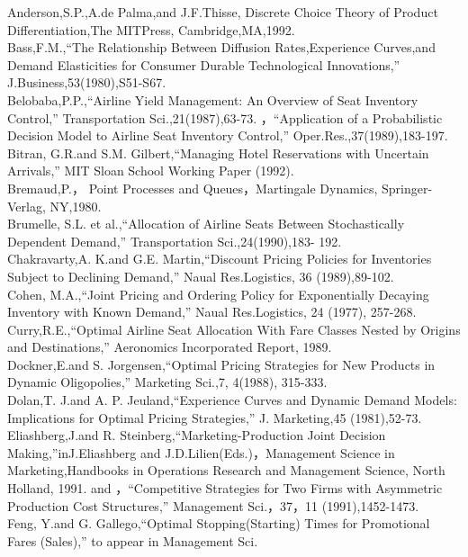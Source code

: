 Anderson,S.P.,A.de Palma,and J.F.Thisse, Discrete Choice Theory of
Product Differentiation,The MITPress, Cambridge,MA,1992.\\
Bass,F.M.,``The Relationship Between Diffusion Rates,Experience
Curves,and Demand Elasticities for Consumer Durable Technological
Innovations,'' J.Business,53(1980),S51-S67.\\
Belobaba,P.P.,``Airline Yield Management: An Overview of Seat Inventory
Control,'' Transportation Sci.,21(1987),63-73. ，``Application of a
Probabilistic Decision Model to Airline Seat Inventory Control,''
Oper.Res.,37(1989),183-197.\\
Bitran, G.R.and S.M. Gilbert,``Managing Hotel Reservations with
Uncertain Arrivals,'' MIT Sloan School Working Paper (1992).\\
Bremaud,P.， Point Processes and Queues，Martingale Dynamics,
Springer-Verlag, NY,1980.\\
Brumelle, S.L. et al.,``Allocation of Airline Seats Between
Stochastically Dependent Demand,'' Transportation Sci.,24(1990),183-
192.\\
Chakravarty,A. K.and G.E. Martin,``Discount Pricing Policies for
Inventories Subject to Declining Demand,'' Naual Res.Logistics, 36
(1989),89-102.\\
Cohen, M.A.,``Joint Pricing and Ordering Policy for Exponentially
Decaying Inventory with Known Demand,'' Naual Res.Logistics, 24 (1977),
257-268.\\
Curry,R.E.,``Optimal Airline Seat Allocation With Fare Classes Nested by
Origins and Destinations,'' Aeronomics Incorporated Report, 1989.\\
Dockner,E.and S. Jorgensen,``Optimal Pricing Strategies for New Products
in Dynamic Oligopolies,'' Marketing Sci.,7, 4(1988), 315-333.\\
Dolan,T. J.and A. P. Jeuland,``Experience Curves and Dynamic Demand
Models: Implications for Optimal Pricing Strategies,'' J. Marketing,45
(1981),52-73.\\
Eliashberg,J.and R. Steinberg,``Marketing-Production Joint Decision
Making,''inJ.Eliashberg and J.D.Lilien(Eds.)，Management Science in
Marketing,Handbooks in Operations Research and Management Science, North
Holland, 1991. and ，``Competitive Strategies for Two Firms with
Asymmetric Production Cost Structures,'' Management Sci.，37，11
(1991),1452-1473.\\
Feng, Y.and G. Gallego,``Optimal Stopping(Starting) Times for
Promotional Fares (Sales),'' to appear in Management Sci.\\

